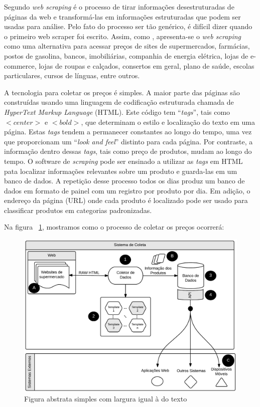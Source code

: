 \documentclass[twoside,a4paper,11pt]{report}
\begin{document}
Segundo \citet{manning2008introduction} \emph{web scraping} é o processo de tirar informações desestruturadas de páginas da web e transformá-las em informações estruturadas que podem ser usadas para análise.  Pelo fato do processo ser tão genérico, é difícil dizer quando o primeiro web scraper foi escrito. Assim, como \citet{cavallo2010scraped}, apresenta-se o \emph{web scraping} como uma alternativa para acessar preços de sites de supermercados, farmácias, postos de gasolina, bancos, imobiliárias, companhia de energia elétrica, lojas de e-commerce, lojas de roupas e calçados, consertos em geral, plano de saúde, escolas particulares, cursos de línguas, entre outros. 

A tecnologia para coletar os preços é simples. A maior parte das páginas são construídas usando uma linguagem de codificação estruturada chamada de \emph{HyperText Markup Language} (HTML). Este código tem “\emph{tags}”, tais como $<center>$ e $<bold>$, que determinam o estilo e localização do texto em uma página. Estas \emph{tags} tendem a permanecer constantes ao longo do tempo, uma vez que proporcionam um “\emph{look and feel}” distinto para cada página. Por contraste, a informação dentro dessas \emph{tags}, tais como preço de produtos, mudam ao longo do tempo. O software de \emph{scraping} pode ser ensinado a utilizar as \emph{tags} em HTML pata localizar informações relevantes sobre um produto e guarda-las em um banco de dados. A repetição desse processo todos os dias produz um banco de dados em formato de painel com um registro por produto por dia. Em adição, o endereço da página (URL) onde cada produto é localizado pode ser usado para classificar produtos em categorias padronizadas. 

Na figura ~\ref{fig:01}, mostramos como o processo de coletar os preços ocorrerá:

\begin{figure}[htbp]
  \centering
  \includegraphics[width=\textwidth]{WebScraping}
  \caption[Figura Simples]{Figura abstrata simples com largura igual à do texto}
  \label{fig:01}
\end{figure}
\end{document}
